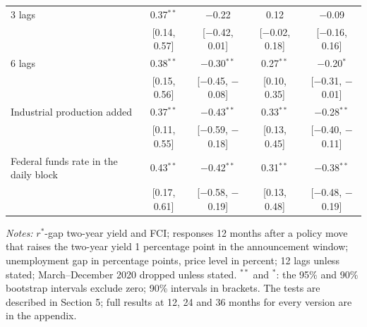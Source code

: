 \begin{table}[tp]
{\begin{tabular}{lcccc}
3 lags & 0.37$^{**}$ & $-$0.22 & 0.12 & $-$0.09\\
 & {\scriptsize [0.14, 0.57]} & {\scriptsize [$-$0.42, 0.01]} & {\scriptsize [$-$0.02, 0.18]} & {\scriptsize [$-$0.16, 0.16]}\\
6 lags & 0.38$^{**}$ & $-$0.30$^{**}$ & 0.27$^{**}$ & $-$0.20$^{*}$\\
 & {\scriptsize [0.15, 0.56]} & {\scriptsize [$-$0.45, $-$0.08]} & {\scriptsize [0.10, 0.35]} & {\scriptsize [$-$0.31, $-$0.01]}\\
Industrial production added & 0.37$^{**}$ & $-$0.43$^{**}$ & 0.33$^{**}$ & $-$0.28$^{**}$\\
 & {\scriptsize [0.11, 0.55]} & {\scriptsize [$-$0.59, $-$0.18]} & {\scriptsize [0.13, 0.45]} & {\scriptsize [$-$0.40, $-$0.11]}\\
Federal funds rate in the daily block & 0.43$^{**}$ & $-$0.42$^{**}$ & 0.31$^{**}$ & $-$0.38$^{**}$\\
 & {\scriptsize [0.17, 0.61]} & {\scriptsize [$-$0.58, $-$0.19]} & {\scriptsize [0.13, 0.48]} & {\scriptsize [$-$0.48, $-$0.19]}\\
\bottomrule\end{tabular}}
\begin{flushleft}\footnotesize\textit{Notes:} $r^*$-gap two-year yield and FCI; responses 12 months after a policy move that raises the two-year yield 1 percentage point in the announcement window; unemployment gap in percentage points, price level in percent; 12 lags unless stated; March--December 2020 dropped unless stated. $^{**}$ and $^{*}$: the 95\% and 90\% bootstrap intervals exclude zero; 90\% intervals in brackets. The tests are described in Section 5; full results at 12, 24 and 36 months for every version are in the appendix.\end{flushleft}
\end{table}
